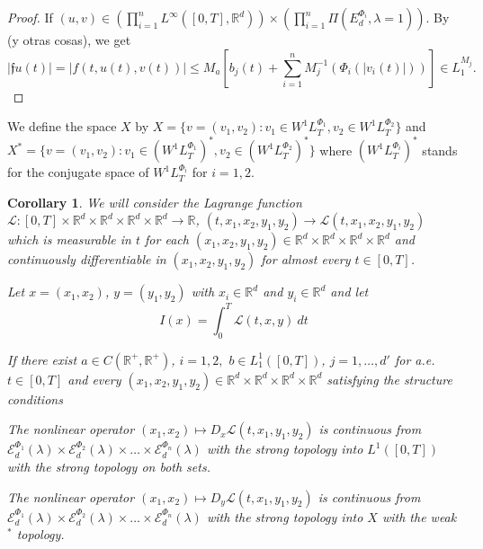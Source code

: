 \documentclass[twoside]{article}
\newtheorem{cor}[thm]{Corollary}
\theoremstyle{remark}
\newcommand{\domiuno}{\mathcal{E}^{\Phi_1}_d(\lambda)}
\newcommand{\domidos}{\mathcal{E}^{\Phi_2}_d(\lambda)}
\newcommand{\domin}{\mathcal{E}^{\Phi_n}_d(\lambda)}
\newcommand{\rr}{\mathbb{R}}
\renewcommand{\leq}{\leqslant}
\newcommand{\Phie}{\Phi^{*}}
\begin{document}
\begin{proof}
If $(u,v)\in \left(\prod\limits_{i=1}^n L^{\infty}([0,T],\rr^d)\right) \times \left(\prod\limits_{i=1}^n \Pi(E_d^{\Phi_i},\lambda=1)\right)$.
By \cite[ Thm. 17.6]{KR} (y otras cosas), we get 
 \[|\mathfrak{f}u(t)|=|f(t,u(t),v(t))| \leq 
M_a [b_j(t) +\sum_{i=1}^{n} M_j^{-1}(\Phi_i(|v_i(t)|))]
\in
 L_1^{M_j}.\]
\end{proof}

We define the space $X$ by
$X=\{v=(v_1,v_2):v_1 \in W^{1}L^{\Phi_1}_T,v_2\in W^{1}L^{\Phi_2}_T\}$
and 
$X^*=\{v=(v_1,v_2):v_1 \in (W^{1}L^{\Phi_1}_T)^*,v_2\in (W^{1}L^{\Phi_2}_T)^*\}$
where $(W^{1}L^{\Phi_i}_T)^*$ stands for the conjugate space of $W^{1}L^{\Phi_i}_T$ for $i=1,2$.

\begin{cor}
We will consider the Lagrange function
$\mathcal{L}:[0,T]\times\rr^d\times\rr^d\times\rr^d\times\rr^d\to\rr$, $(t,x_1,x_2,y_1,y_2)\to \mathcal{L}(t,x_1,x_2,y_1,y_2)$
which is measurable in $t$ for each $(x_1,x_2,y_1,y_2)\in \rr^d\times\rr^d\times\rr^d\times\rr^d$ and continuously differentiable 
in $(x_1,x_2,y_1,y_2)$ for almost every $t \in [0,T]$. 

Let $x=(x_1,x_2)$, $y=(y_1,y_2)$ with $x_i \in \rr^d$ and $y_i \in \rr^d$ and let 
\begin{equation}\label{integral_accion}
I(x)=\int_{0}^T \mathcal{L}(t,x,y)\ dt
\end{equation}


If there exist $a\in C(\rr^+,\rr^+)$, $i=1,2,$
$b \in L^1_1([0,T])$, $j=1,\dots,d'$ for a.e. $t \in [0, T]$ and 
every $(x_1,x_2,y_1,y_2)\in \rr^d\times\rr^d\times\rr^d\times\rr^d$ satisfying the structure conditions 


The nonlinear operator $(x_1,x_2)\mapsto D_x\mathcal{L}(t,x_1,y_1, y_2)$ is continuous from $\domiuno\times\domidos\times\dots\times\domin$ with the strong topology  into $L^1([0,T])$  with the strong topology on both sets.

The nonlinear operator $(x_1,x_2)\mapsto D_y\mathcal{L}(t,x_1,y_1, y_2)$ is continuous from $\domiuno\times\domidos\times\dots\times\domin$ with the strong topology  into $X$  with the weak$^*$ topology.



\end{cor}
\end{document}
